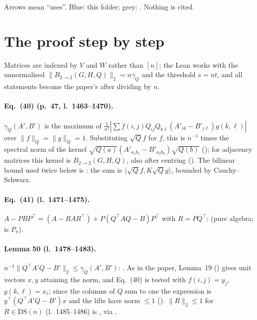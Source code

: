 \begin{center}
\end{center}
Arrows mean ``uses''. Blue: this folder; grey: . Nothing is cited.

\section{The proof step by step}
Matrices are indexed by $V$ and $W$ rather than $[n]$; the Lean works with the unnormalised
$\|B_{2\to2}(G,H,Q)\|_2=n\gamma_Q$ and the threshold $s=nt$, and all statements become the paper's after dividing
by $n$.

\paragraph{Eq.~(40) (p.~47, l.~1463--1470).} $\gamma_Q(A',B')$ is the maximum of
$\frac1{n^2}|\sum f(i,j)Q_{ij}Q_{k\ell}(A'_{ik}-B'_{j\ell})g(k,\ell)|$ over $\|f\|_Q=\|g\|_Q=1$. Substituting
$\sqrt Q f$ for $f$, this is $n^{-1}$ times the spectral norm of the kernel
$\sqrt{Q(a)}(A'_{a_1b_1}-B'_{a_2b_2})\sqrt{Q(b)}$ (); for adjacency matrices this kernel is
$B_{2\to2}(G,H,Q)$, also after centring (). The bilinear bound used twice below is
: the sum is $\langle\sqrt Q f,K\sqrt Q g\rangle$, bounded by Cauchy--Schwarz.

\paragraph{Eq.~(41) (l.~1471--1475).} $A-PBP^\top=(A-RAR^\top)+P(Q^\top AQ-B)P^\top$ with $R=PQ^\top$:
 (pure algebra;  is $P_\pi$).

\paragraph{Lemma 50 (l.~1478--1483).} $n^{-1}\|Q^\top A'Q-B'\|_2\le\gamma_Q(A',B')$: . As in the
paper, Lemma~19 () gives unit vectors $x,y$ attaining the norm, and
Eq.~(40) is tested with $f(i,j)=y_j$, $g(k,\ell)=x_\ell$; since the columns of $Q$ sum to one the expression is
$y^\top(Q^\top A'Q-B')x$ and the lifts have norm $\le1$ (). $\|R\|_2\le1$ for
$R\in\mathrm{DS}(n)$ (l.~1485--1486) is , via .

